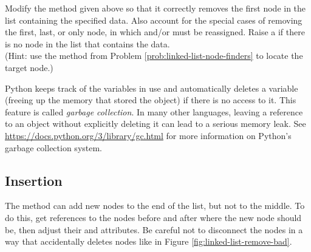 \begin{problem} %
Modify the  method given above so that it correctly removes the first node in the list containing the specified data.
Also account for the special cases of removing the first, last, or only node, in which  and/or  must be reassigned.
Raise a  if there is no node in the list that contains the data.
\\(Hint: use the  method from Problem \ref{prob:linked-list-node-finders} to locate the target node.)
\end{problem}

\begin{warn} %
Python keeps track of the variables in use and automatically deletes a variable (freeing up the memory that stored the object) if there is no access to it.
This feature is called \emph{garbage collection}.
In many other languages, leaving a reference to an object without explicitly deleting it can lead to a serious memory leak.
See \url{https://docs.python.org/3/library/gc.html} for more information on Python's garbage collection system.
\end{warn}

\subsection*{Insertion} %

The  method can add new nodes to the end of the list, but not to the middle.
To do this, get references to the nodes before and after where the new node should be, then adjust their  and  attributes.
Be careful not to disconnect the nodes in a way that accidentally deletes nodes like in Figure \ref{fig:linked-list-remove-bad}.

